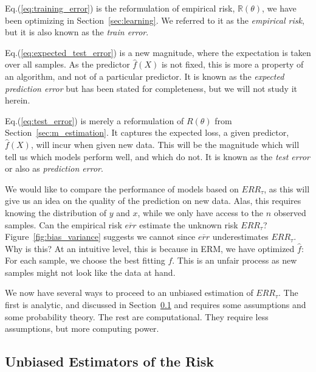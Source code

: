 \documentclass[12pt,a4paper]{article}
\theoremstyle{plain}
\theoremstyle{definition}
\newcommand{\risk}{R}
\newcommand{\riskn}{\mathbb{R}}
\newcommand{\hyp}{f}
\newcommand{\sample}{\tau}
\newcommand{\test}{ERR_\sample}
\newcommand{\train}{\overline{err}}
\begin{document}
Eq.(\ref{eq:training_error}) is the reformulation of empirical risk, $\riskn(\theta)$, we have been optimizing in Section~\ref{sec:learning}.
We referred to it as the \emph{empirical risk}, but it is also known as the \emph{train error}.

Eq.(\ref{eq:expected_test_error}) is a new magnitude, where the expectation is taken over all samples. As the predictor $\hat{\hyp}(X)$ is not fixed, this is more a property of an algorithm, and not of a particular predictor. 
It is known as the \emph{expected prediction error} but has been stated for completeness, but we will not study it herein.

Eq.(\ref{eq:test_error}) is merely a reformulation of $\risk(\theta)$ from Section~\ref{sec:m_estimation}.
It captures the expected loss, a given predictor, $\hat{\hyp}(X)$, will incur when given new data.
This will be the magnitude which will tell us which models perform well, and which do not.
It is known as the \emph{test error} or also as \emph{prediction error}.



We would like to compare the performance of models based on $\test$, as this will give us an idea on the quality of the prediction on new data. 
Alas, this requires knowing the distribution of $y$ and $x$, while we only have access to the $n$ observed samples.
Can the empirical risk $\train$ estimate the unknown risk $\test$? 
Figure~\ref{fig:bias_variance} suggests we cannot since $\train$ underestimates $\test$.
Why is this?
At an intuitive level, this is because in ERM, we have optimized $\hat{\hyp}$: 
For each sample, we choose the best fitting $\hyp$. This is an unfair process as new samples might not look like the data at hand.

We now have several ways to proceed to an unbiased estimation of $\test$. 
The first is analytic, and discussed in Section~\ref{sec:risk_estimation} and requires some assumptions and some probability theory.
The rest are computational. They require less assumptions, but more computing power.




\subsection{Unbiased Estimators of the Risk}
\label{sec:risk_estimation}
\end{document}
